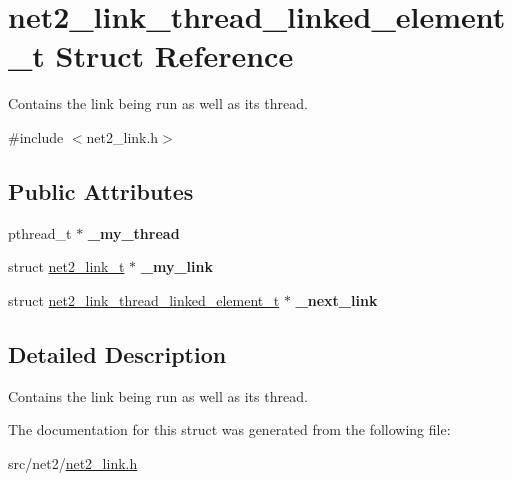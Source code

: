 \hypertarget{structnet2__link__thread__linked__element__t}{}\section{net2\+\_\+link\+\_\+thread\+\_\+linked\+\_\+element\+\_\+t Struct Reference}
\label{structnet2__link__thread__linked__element__t}


Contains the link being run as well as its thread.  




{\ttfamily \#include $<$net2\+\_\+link.\+h$>$}

\subsection*{Public Attributes}
\begin{DoxyCompactItemize}
\item 
\hypertarget{structnet2__link__thread__linked__element__t_a4de69b752a1213f5cc228e1dd8f83b95}{}pthread\+\_\+t $\ast$ {\bfseries \+\_\+my\+\_\+thread}\label{structnet2__link__thread__linked__element__t_a4de69b752a1213f5cc228e1dd8f83b95}

\item 
\hypertarget{structnet2__link__thread__linked__element__t_a99b68d692f86432ad06502f28f89c175}{}struct \hyperlink{structnet2__link__t}{net2\+\_\+link\+\_\+t} $\ast$ {\bfseries \+\_\+my\+\_\+link}\label{structnet2__link__thread__linked__element__t_a99b68d692f86432ad06502f28f89c175}

\item 
\hypertarget{structnet2__link__thread__linked__element__t_aee53ad34cc55f3b702c5395a5728879d}{}struct \hyperlink{structnet2__link__thread__linked__element__t}{net2\+\_\+link\+\_\+thread\+\_\+linked\+\_\+element\+\_\+t} $\ast$ {\bfseries \+\_\+next\+\_\+link}\label{structnet2__link__thread__linked__element__t_aee53ad34cc55f3b702c5395a5728879d}

\end{DoxyCompactItemize}


\subsection{Detailed Description}
Contains the link being run as well as its thread. 

The documentation for this struct was generated from the following file\+:\begin{DoxyCompactItemize}
\item 
src/net2/\hyperlink{net2__link_8h}{net2\+\_\+link.\+h}\end{DoxyCompactItemize}
